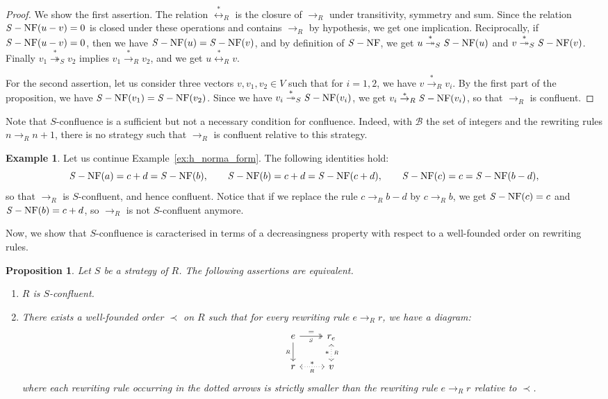 \documentclass[10pt]{easychair}
\newtheorem{proposition}[theorem]{Proposition}
\theoremstyle{definition}
\newtheorem{example}[theorem]{Example}
\newcommand\basis{\mathscr{B}}
\newcommand\rewR{\to_R}
\newcommand\transR{\overset{*}{\to}_R}
\newcommand\transS{\overset{*}{\twoheadrightarrow}_S}
\newcommand\equivR{\overset{*}{\leftrightarrow}_R}
\DeclareMathOperator{\SNF}{{\it S}-NF}
\begin{document}
\begin{proof}
  We show the first assertion. The relation $\equivR$ is the closure of
  $\rewR$ under transitivity, symmetry and sum. Since the relation
  $\SNF(u-v)=0$ is closed under these operations and contains $\rewR$ by
  hypothesis, we get one implication. Reciprocally, if $\SNF(u-v)=0$,
  then we have $\SNF(u)=\SNF(v)$, and by definition of $\SNF$, we get
  $u\transS\SNF(u)$ and $v\transS\SNF(v)$. Finally $v_1\transS v_2$
  implies $v_1\transR v_2$, and we get $u\equivR v$.

  For the second assertion, let us consider three vectors
  $v,v_1,v_2\in V$ such that for $i=1,2$, we have $v\transR v_i$. By the
  first part of the proposition, we have $\SNF(v_1)=\SNF(v_2)$. Since we
  have $v_i\transS\SNF(v_i)$, we get $v_i\transR\SNF(v_i)$, so that
  $\rewR$ is confluent.
\end{proof}
\smallskip

Note that $S$-confluence is a sufficient but not a necessary condition
for confluence. Indeed, with $\basis$ the set of integers and the
rewriting rules $n\rewR n+1$, there is no strategy such that $\rewR$ is
confluent relative to this strategy.
\smallskip

\begin{example}
  Let us continue Example~\ref{ex:h_norma_form}. The following identities
  hold:
  \[\SNF(a)=c+d=\SNF(b),\qquad\SNF(b)=c+d=\SNF(c+d),\qquad
  \SNF(c)=c=\SNF(b-d),
  \]
  so that $\rewR$ is $S$-confluent, and hence confluent. Notice that if
  we replace the rule $c\rewR b-d$ by $c\rewR b$, we get $\SNF(c)=c$ and
  $\SNF(b)=c+d$, so $\rewR$ is not $S$-confluent anymore. 
\end{example}
\smallskip

Now, we show that $S$-confluence is caracterised in terms of a
decreasingness property with respect to a well-founded order on rewriting
rules.
\smallskip

\begin{proposition}
  Let $S$ be a strategy of $R$. The following assertions are equivalent.
  \begin{enumerate}
  \item $R$ is $S$-confluent.
  \item There exists a well-founded order $\prec$ on $R$ such that for
    every rewriting rule $e\rewR r$, we have a diagram:
    \[\begin{tikzcd}
    e\ar[d, "_R"']\ar[r, twoheadrightarrow, "=", "_S"'] &
    r_e\ar[d, leftrightarrow, dotted, "*"', "_R"]\\
    r\ar[r, leftrightarrow, dotted, "*", "_R"'] & v
    \end{tikzcd}\]
    where each rewriting rule occurring in the dotted arrows is strictly
    smaller than the rewriting rule $e\rewR r$ relative to $\prec$.
  \end{enumerate}
\end{proposition}
\end{document}
